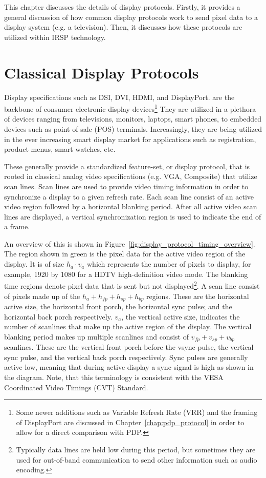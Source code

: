 \label{chap:display_protocols}
This chapter discusses the details of display protocols. Firstly, it provides a general discussion of how common display protocols work to send pixel data to a display system (e.g. a television). Then, it discusses how these protocols are utilized within IRSP technology.

\section{Classical Display Protocols}
    \label{sec:classical_display_protocols}

    Display specifications such as DSI\cite{HDMIForum2017}, DVI\cite{DDWG1999}, HDMI\cite{HDMIForum2018}, and DisplayPort.\cite{VESA2016} are the backbone of consumer electronic display devices\footnote{Some newer additions such as Variable Refresh Rate (VRR) and the framing of DisplayPort are discussed in Chapter~\ref{chap:pdp_protocol} in order to allow for a direct comparison with PDP.} They are utilized in a plethora of devices ranging from televisions, monitors, laptops, smart phones, to embedded devices such as point of sale (POS) terminals. Increasingly, they are being utilized in the ever increasing smart display market for applications such as registration, product menus, smart watches, etc.

    These generally provide a standardized feature-set, or display protocol, that is rooted in classical analog video specifications (e.g. VGA, Composite)\cite{NIAnalog} that utilize scan lines\cite{Neal1998}. Scan lines are used to provide video timing information in order to synchronize a display to a given refresh rate. Each scan line consist of an active video region followed by a horizontal blanking period. After all active video scan lines are displayed, a vertical synchronization region is used to indicate the end of a frame.

    An overview of this is shown in Figure~\ref{fig:display_protocol_timing_overview}. The region shown in green is the pixel data for the active video region of the display. It is of size $h_a\cdot v_a$ which represents the number of pixels to display, for example, 1920 by 1080 for a HDTV high-definition video mode\cite{MythTVWebsite}. The blanking time regions denote pixel data that is sent but not displayed\footnote{Typically data lines are held low during this period, but sometimes they are used for out-of-band communication to send other information such as audio encoding.}. A scan line consist of pixels made up of the $h_a+h_{fp}+h_{sp}+h_{bp}$ regions. These are the horizontal active size, the horizontal front porch, the horizontal sync pulse; and the horizontal back porch respectively. $v_a$, the vertical active size, indicates the number of scanlines that make up the active region of the display. The vertical blanking period makes up multiple scanlines and consist of $v_{fp}+v_{sp}+v_{bp}$ scanlines. These are the vertical front porch before the vsync pulse, the vertical sync pulse, and the vertical back porch respectively. Sync pulses are generally active low, meaning that during active display a sync signal is high as shown in the diagram. Note, that this terminology is consistent with the VESA Coordinated Video Timings (CVT) Standard\cite{VESA2013}.

